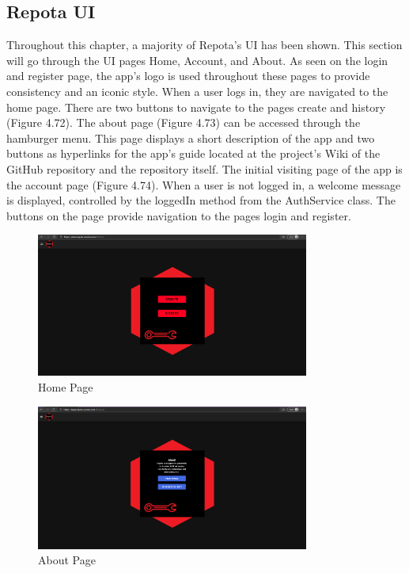\subsection{Repota UI}
Throughout this chapter, a majority of Repota's UI has been shown. This section will go through the UI pages Home, Account, and About. As seen on the login and register page, the app's logo is used throughout these pages to provide consistency and an iconic style. When a user logs in, they are navigated to the home page. There are two buttons to navigate to the pages create and history (Figure 4.72). The about page (Figure 4.73) can be accessed through the hamburger menu. This page displays a short description of the app and two buttons as hyperlinks for the app's guide located at the project's Wiki of the GitHub repository and the repository itself. The initial visiting page of the app is the account page (Figure 4.74). When a user is not logged in, a welcome message is displayed, controlled by the loggedIn method from the AuthService class. The buttons on the page provide navigation to the pages login and register. 

\begin{figure}[H]
    \centering
    \caption{Home Page}
    \label{image:homePage}
    \includegraphics[width=0.8\textwidth]{images/repota/UI/home-page.png}
\end{figure}

\begin{figure}[H]
    \centering
    \caption{About Page}
    \label{image:aboutPage}
    \includegraphics[width=0.8\textwidth]{images/repota/UI/about.png}
\end{figure}

